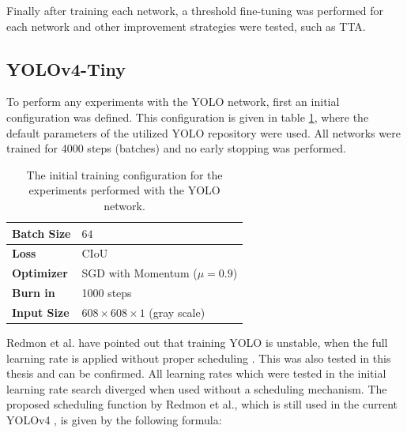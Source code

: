 Finally after training each network, a threshold fine-tuning was performed for each network and other improvement strategies were tested, such as \ac{TTA}.


\subsection{YOLOv4-Tiny}
\label{sec:training_yolo}

To perform any experiments with the \ac{YOLO} network, first an initial configuration was defined.
This configuration is given in table \ref{tab:initial_yolo_config}, where the default parameters of the utilized YOLO repository were used.
All networks were trained for 4000 steps (batches) and no early stopping was performed.

\begin{table}[H]
\footnotesize
\begin{center}
\begin{tabular}{|l|l|}

\hline
\textbf{Batch Size} & $64$\\
\hline
\textbf{Loss} & CIoU \\
\hline
\textbf{Optimizer} & \ac{SGD} with Momentum ($\mu = 0.9$)\\
\hline
\textbf{Burn in} & 1000 steps \\
\hline
\textbf{Input Size} & $608 \times 608 \times 1$ (gray scale) \\
\hline

\end{tabular}
\caption{The initial training configuration for the experiments performed with the YOLO network.}
\label{tab:initial_yolo_config}
\end{center}
\end{table}

Redmon et al. have pointed out that training \ac{YOLO} is unstable, when the full learning rate is applied without proper scheduling \cite{yolov2}.
This was also tested in this thesis and can be confirmed.
All learning rates which were tested in the initial learning rate search diverged when used without a scheduling mechanism.
The proposed scheduling function by Redmon et al., which is still used in the current \ac{YOLOv4} \cite{yolov4}, is given by the following formula:

